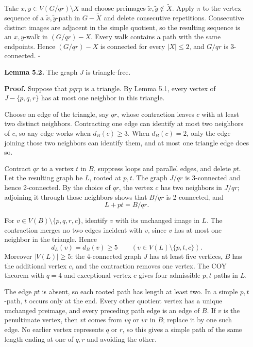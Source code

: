 \documentclass[
  11pt]{article}
\begin{document}
Take \(x,y\in V(G/qr)\setminus X\) and choose preimages
\(\widetilde x,\widetilde y\notin\widetilde X\). Apply \(\pi\) to the
vertex sequence of a \(\widetilde x,\widetilde y\)-path in
\(G-\widetilde X\) and delete consecutive repetitions. Consecutive
distinct images are adjacent in the simple quotient, so the resulting
sequence is an \(x,y\)-walk in \((G/qr)-X\). Every walk contains a path
with the same endpoints. Hence \((G/qr)-X\) is connected for every
\(|X|\le2\), and \(G/qr\) is 3-connected. \(\square\)

\textbf{Lemma 5.2.} The graph \(J\) is triangle-free.

\textbf{Proof.} Suppose that \(pqrp\) is a triangle. By Lemma 5.1, every
vertex of \(J-\{p,q,r\}\) has at most one neighbor in this triangle.

Choose an edge of the triangle, say \(qr\), whose contraction leaves
\(c\) with at least two distinct neighbors. Contracting one edge can
identify at most two neighbors of \(c\), so any edge works when
\(d_B(c)\ge3\). When \(d_B(c)=2\), only the edge joining those two
neighbors can identify them, and at most one triangle edge does so.

Contract \(qr\) to a vertex \(t\) in \(B\), suppress loops and parallel
edges, and delete \(pt\). Let the resulting graph be \(L\), rooted at
\(p,t\). The graph \(J/qr\) is 3-connected and hence 2-connected. By the
choice of \(qr\), the vertex \(c\) has two neighbors in \(J/qr\);
adjoining it through those neighbors shows that \(B/qr\) is 2-connected,
and \[
 L+pt=B/qr.
\] 

For \(v\in V(B)\setminus\{p,q,r,c\}\), identify \(v\) with its unchanged
image in \(L\). The contraction merges no two edges incident with \(v\),
since \(v\) has at most one neighbor in the triangle. Hence \[
 d_L(v)=d_B(v)\ge5
 \qquad(v\in V(L)\setminus\{p,t,c\}).
\] Moreover \(|V(L)|\ge5\): the 4-connected graph \(J\) has at least
five vertices, \(B\) has the additional vertex \(c\), and the
contraction removes one vertex. The COY theorem with \(q=4\) and
exceptional vertex \(c\) gives four admissible \(p,t\)-paths in \(L\).

The edge \(pt\) is absent, so each rooted path has length at least two.
In a simple \(p,t\)-path, \(t\) occurs only at the end. Every other
quotient vertex has a unique unchanged preimage, and every preceding
path edge is an edge of \(B\). If \(v\) is the penultimate vertex, then
\(vt\) comes from \(vq\) or \(vr\) in \(B\); replace it by one such
edge. No earlier vertex represents \(q\) or \(r\), so this gives a
simple path of the same length ending at one of \(q,r\) and avoiding the
other.
\end{document}
